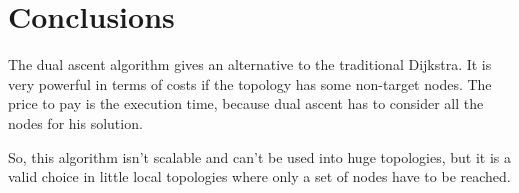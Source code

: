 \chapter{Conclusions}\label{ch:conclusion}

The dual ascent algorithm gives an alternative to the traditional Dijkstra. It
is very powerful in terms of costs if the topology has some non-target nodes.
The price to pay is the execution time, because dual ascent has to consider all
the nodes for his solution. 

So, this algorithm isn't scalable and can't be used into huge topologies, but it
is a valid choice in little local topologies where only a set of nodes have to
be reached.
